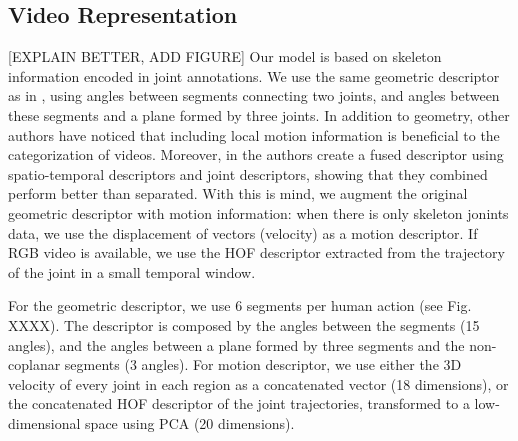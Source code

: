\subsection{Video Representation} \label{subsec:videorepresentation}

[EXPLAIN BETTER, ADD FIGURE]
Our model is based on skeleton information encoded in joint annotations.  We use the same geometric descriptor as in \cite{Lillo2014}, using angles between segments connecting two joints, and angles between these segments and a plane formed by three joints. In addition to geometry, other authors \cite{Zanfir2013,Tao2015,Wang2014} have noticed that including local motion information is beneficial to the categorization of videos. Moreover, in \cite{zhu2013fusing} the authors create a fused descriptor using spatio-temporal descriptors and joint descriptors, showing that they combined perform better than separated. With this is mind, we augment the original geometric descriptor with motion information: when there is only skeleton jonints data, we use the displacement of vectors (velocity) as a motion descriptor. If RGB video is available, we use the HOF descriptor extracted from the trajectory of the joint in a small temporal window.

For the geometric descriptor, we use 6 segments per human action (see Fig. XXXX). The descriptor is composed by the angles between the segments (15 angles), and the angles between a plane formed by three segments and the non-coplanar segments (3 angles). For motion descriptor, we use either the 3D velocity of every joint in each region as a concatenated vector (18 dimensions), or the concatenated HOF descriptor of the joint trajectories, transformed to a low-dimensional space using PCA (20 dimensions).
